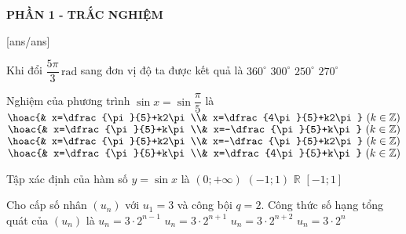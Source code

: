 
\begin{center}
	\textbf{PHẦN 1 - TRẮC NGHIỆM}
\end{center}
[ans/ans]

\begin{ex}%
	Khi đổi $\dfrac{5\pi }{3}\,\mathrm{rad}$ sang đơn vị độ ta được kết quả là
	\choice
	{$360^\circ$}
	{\True $300^\circ$}
	{$250^\circ$}
	{$270^\circ$}
\end{ex}
\begin{ex}%
	Nghiệm của phương trình $\sin x=\sin \dfrac{\pi }{5}$ là
	\choice
	{\True $\hoac{& x=\dfrac{\pi }{5}+k2\pi \\& x=\dfrac{4\pi }{5}+k2\pi}\,\left( k\in \mathbb{Z} \right)$}
	{$\hoac{& x=\dfrac{\pi }{5}+k\pi \\& x=-\dfrac{\pi }{5}+k\pi}\,\left( k\in \mathbb{Z} \right)$}
	{$\hoac{& x=\dfrac{\pi }{5}+k2\pi \\& x=-\dfrac{\pi }{5}+k2\pi}\,\left( k\in \mathbb{Z} \right)$}
	{$\hoac{& x=\dfrac{\pi }{5}+k\pi \\& x=\dfrac{4\pi }{5}+k\pi}\,\left( k\in \mathbb{Z} \right)$}
\end{ex}
\begin{ex}%
	Tập xác định của hàm số $y=\sin x$ là
	\choice
	{$\left( 0;+\infty \right)$}
	{$\left( -1;1 \right)$}
	{\True $\mathbb{R}$}
	{$\left[ -1;1 \right]$}
\end{ex}
\begin{ex}%
	Cho cấp số nhân $(u_n)$ với $u_1=3$ và công bội $q=2$. Công thức số hạng tổng quát của $(u_n)$ là
	\choice
	{\True $u_n=3\cdot 2^{n-1}$}
	{$u_n=3\cdot 2^{n+1}$}
	{$u_n=3\cdot 2^{n+2}$}
	{$u_n=3\cdot 2^n$}
\end{ex}
